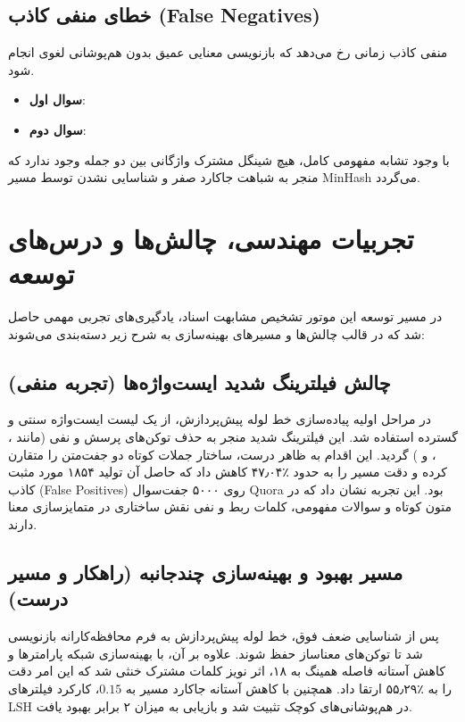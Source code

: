 \documentclass[12pt,onecolumn,a4paper]{article}
\begin{document}
\subsection{خطای منفی کاذب (False Negatives)}
منفی کاذب زمانی رخ می‌دهد که بازنویسی معنایی عمیق بدون هم‌پوشانی لغوی انجام شود.
\begin{itemize}
\item \textbf{سوال اول}: 
\item \textbf{سوال دوم}: 
\end{itemize}
با وجود تشابه مفهومی کامل، هیچ شینگل مشترک واژگانی بین دو جمله وجود ندارد که منجر به شباهت جاکارد صفر و شناسایی نشدن توسط مسیر MinHash می‌گردد.

\section{تجربیات مهندسی، چالش‌ها و درس‌های توسعه}

در مسیر توسعه این موتور تشخیص مشابهت اسناد، یادگیری‌های تجربی مهمی حاصل شد که در قالب چالش‌ها و مسیرهای بهینه‌سازی به شرح زیر دسته‌بندی می‌شوند:

\subsection{چالش فیلترینگ شدید ایست‌واژه‌ها (تجربه منفی)}
در مراحل اولیه پیاده‌سازی خط لوله پیش‌پردازش، از یک لیست ایست‌واژه سنتی و گسترده استفاده شد. این فیلترینگ شدید منجر به حذف توکن‌های پرسش و نفی (مانند ، ،  و ) گردید. این اقدام به ظاهر درست، ساختار جملات کوتاه دو جفت‌متن را متقارن کرده و دقت مسیر  را به حدود ٪۴۷٫۰۴ کاهش داد که حاصل آن تولید ۱۸۵۴ مورد مثبت کاذب (False Positives) روی ۵۰۰۰ جفت‌سوال Quora بود. این تجربه نشان داد که در متون کوتاه و سوالات مفهومی، کلمات ربط و نفی نقش ساختاری در متمایزسازی معنا دارند.

\subsection{مسیر بهبود و بهینه‌سازی چندجانبه (راهکار و مسیر درست)}
پس از شناسایی ضعف فوق، خط لوله پیش‌پردازش به فرم محافظه‌کارانه بازنویسی شد تا توکن‌های معناساز حفظ شوند. علاوه بر آن، با بهینه‌سازی شبکه پارامترها و کاهش آستانه فاصله همینگ  به ۱۸، اثر نویز کلمات مشترک خنثی شد که این امر دقت را به ٪۵۵٫۲۹ ارتقا داد. همچنین با کاهش آستانه جاکارد مسیر  به $0.15$، کارکرد فیلترهای LSH در هم‌پوشانی‌های کوچک تثبیت شد و بازیابی به میزان ۲ برابر بهبود یافت.
\end{document}

